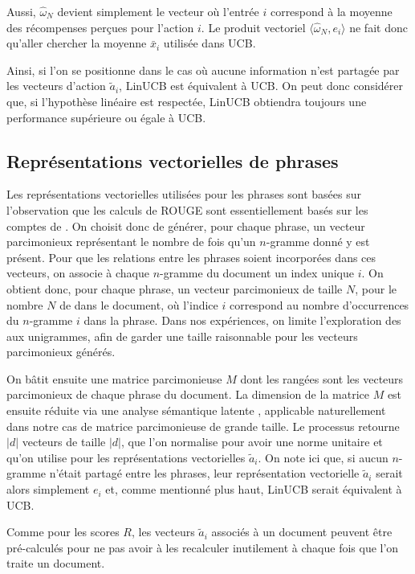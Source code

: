 Aussi, $\hat{\omega}_N$ devient simplement le vecteur où l'entrée $i$ correspond 
à la moyenne des récompenses perçues pour l'action $i$.
Le produit vectoriel $\langle \hat{\omega}_N, e_i \rangle$ ne fait donc qu'aller
chercher la moyenne $\bar{x}_i$ utilisée dans UCB.

Ainsi, si l'on se positionne dans le cas où aucune information n'est partagée par 
les vecteurs d'action $\tilde{a}_i$, LinUCB est équivalent à UCB.
On peut donc considérer que, si l'hypothèse linéaire est respectée, LinUCB 
obtiendra toujours une performance supérieure ou égale à UCB.

\subsection{Représentations vectorielles de phrases}

Les représentations vectorielles utilisées pour les phrases sont basées sur l'observation
que les calculs de ROUGE sont essentiellement basés sur les comptes de \ngrams.
On choisit donc de générer, pour chaque phrase, un vecteur parcimonieux
représentant le nombre de fois qu'un $n$-gramme donné y est présent.
Pour que les relations entre les phrases soient incorporées dans ces vecteurs,
on associe à chaque $n$-gramme du document un index unique $i$.
On obtient donc, pour chaque phrase, un vecteur parcimonieux de taille $N$,
pour le nombre $N$ de \ngrams dans le document, où l'indice $i$ correspond 
au nombre d'occurrences du $n$-gramme $i$ dans la phrase.
Dans nos expériences, on limite l'exploration des \ngrams aux unigrammes,
afin de garder une taille raisonnable pour les vecteurs parcimonieux générés.

On bâtit ensuite une matrice parcimonieuse $M$ dont les rangées sont les vecteurs parcimonieux 
de chaque phrase du document.
La dimension de la matrice $M$ est ensuite réduite via une analyse sémantique latente \citep{10.1145/291128.291131}, 
applicable naturellement dans notre cas de matrice parcimonieuse de grande taille.
Le processus retourne $|d|$ vecteurs de taille $|d|$, que l'on normalise pour avoir 
une norme unitaire et qu'on utilise pour les 
représentations vectorielles $\tilde{a}_i$.
On note ici que, si aucun $n$-gramme n'était partagé entre les phrases,
leur représentation vectorielle $\tilde{a}_i$ serait alors simplement 
$e_i$ et, comme mentionné plus haut, LinUCB serait équivalent à UCB.

Comme pour les scores $R$, les vecteurs $\tilde{a}_i$ associés à un document peuvent 
être pré-calculés pour ne pas avoir à les recalculer inutilement à chaque fois 
que l'on traite un document.

